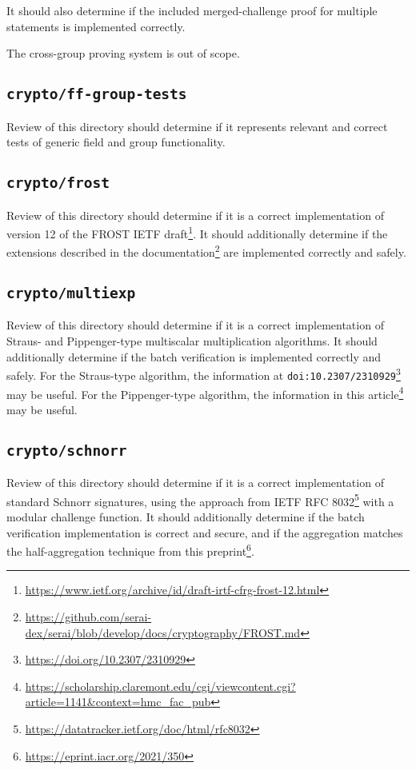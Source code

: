 \documentclass{article}
\begin{document}
It should also determine if the included merged-challenge proof for multiple statements is implemented correctly.

The cross-group proving system is out of scope.


\subsection{\texttt{crypto/ff-group-tests}}

Review of this directory should determine if it represents relevant and correct tests of generic field and group functionality.


\subsection{\texttt{crypto/frost}}

Review of this directory should determine if it is a correct implementation of version 12 of the FROST IETF draft\footnote{\url{https://www.ietf.org/archive/id/draft-irtf-cfrg-frost-12.html}}.
It should additionally determine if the extensions described in the documentation\footnote{\url{https://github.com/serai-dex/serai/blob/develop/docs/cryptography/FROST.md}} are implemented correctly and safely.


\subsection{\texttt{crypto/multiexp}}

Review of this directory should determine if it is a correct implementation of Straus- and Pippenger-type multiscalar multiplication algorithms.
It should additionally determine if the batch verification is implemented correctly and safely.
For the Straus-type algorithm, the information at \texttt{doi:10.2307/2310929}\footnote{\url{https://doi.org/10.2307/2310929}} may be useful.
For the Pippenger-type algorithm, the information in this article\footnote{\url{https://scholarship.claremont.edu/cgi/viewcontent.cgi?article=1141&context=hmc_fac_pub}} may be useful.


\subsection{\texttt{crypto/schnorr}}

Review of this directory should determine if it is a correct implementation of standard Schnorr signatures, using the approach from IETF RFC 8032\footnote{\url{https://datatracker.ietf.org/doc/html/rfc8032}} with a modular challenge function.
It should additionally determine if the batch verification implementation is correct and secure, and if the aggregation matches the half-aggregation technique from this preprint\footnote{\url{https://eprint.iacr.org/2021/350}}.
\end{document}
